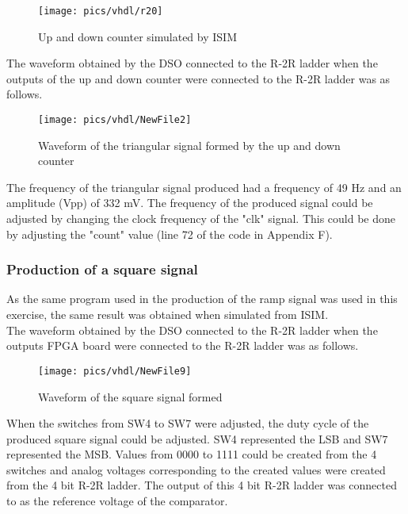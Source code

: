 \begin{figure}[!h]
	\centering
	\texttt{[image: pics/vhdl/r20]}
	\caption{Up and down counter simulated by ISIM}
	\label{fig:r20}
\end{figure}

\noindent
The waveform obtained by the DSO connected to the R-2R ladder when the outputs of the up and down counter were connected to the R-2R ladder was as follows.

\begin{figure}[!h]
	\centering
	\texttt{[image: pics/vhdl/NewFile2]}
	\caption{Waveform of the triangular signal formed by the up and down counter}
	\label{fig:newfile0}
\end{figure}

\noindent
The frequency of the triangular  signal produced had a frequency of 49 Hz and an amplitude (Vpp) of 332 mV. The frequency of the produced signal could be adjusted by changing the clock frequency of the "clk" signal. This could be done by adjusting the "count" value (line 72 of the code in Appendix F).\\

\pagebreak

\subsubsection{Production of a square signal}

\noindent
As the same program used in the production of the ramp signal was used in this exercise, the same result was obtained when simulated from ISIM.\\

\noindent
The waveform obtained by the DSO connected to the R-2R ladder when the outputs FPGA board were connected to the R-2R ladder was as follows. 

\begin{figure}[!h]
	\centering
	\texttt{[image: pics/vhdl/NewFile9]}
	\caption{Waveform of the square signal formed }
	\label{fig:newfile9}
\end{figure}

\noindent
When the switches from SW4 to SW7 were adjusted, the duty cycle of the produced square signal could be adjusted. SW4 represented the LSB and SW7 represented the MSB. Values from 0000 to 1111 could be created from the 4 switches and analog voltages corresponding to the created values were created from the 4 bit R-2R ladder. The output of this 4 bit R-2R ladder was connected to as the reference voltage of the comparator.

